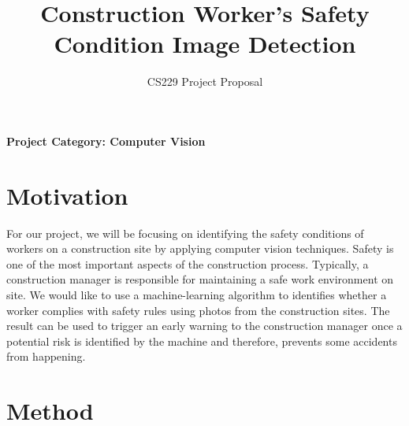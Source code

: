 \documentclass[pdflatex,sn-mathphys]{sn-jnl}%
\begin{document}
\title{Construction Worker's Safety Condition Image Detection}
\subtitle{CS229 Project Proposal}

\author{ }

\author{ }\email{}





\maketitle

\begin{center}
\textbf{Project Category: Computer Vision}
\end{center}
\section{Motivation}\label{sec1}

For our project, we will be focusing on identifying the safety conditions of workers on a construction site by applying computer vision techniques. 
Safety is one of the most important aspects of the construction process. Typically, a construction manager is responsible for maintaining a safe work environment on site. We would like to use a machine-learning algorithm to identifies whether a worker complies with safety rules using photos from the construction sites. The result can be used to trigger an early warning to the construction manager once a potential risk is identified by the machine and therefore, prevents some accidents from happening.

\section{Method}\label{sec2}
\end{document}
